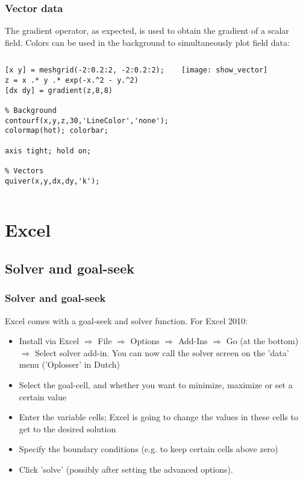 \documentclass[11pt,table,final,fleqn,xcolor={usenames,dvipsnames},unknownkeysallowed]{beamer}
\begin{document}
\begin{frame}[fragile]
  \frametitle{Vector data}
  The gradient operator, as expected, is used to obtain the gradient of a scalar field. Colors can be used in the background to simultaneously plot field data:
  \begin{columns}[T]
    \begin{lstlisting}
[x y] = meshgrid(-2:0.2:2, -2:0.2:2);
z = x .* y .* exp(-x.^2 - y.^2)
[dx dy] = gradient(z,8,8)

% Background
contourf(x,y,z,30,'LineColor','none');
colormap(hot); colorbar;

axis tight; hold on;

% Vectors
quiver(x,y,dx,dy,'k');
    \end{lstlisting}
   \begin{center}
      \texttt{[image: show\_vector]}
    \end{center}
  \end{columns}
\end{frame}

\section{Excel}
\subsection*{Solver and goal-seek}
\begin{frame}
  \frametitle{Solver and goal-seek}
  Excel comes with a goal-seek and solver function. For Excel 2010:
  \begin{itemize}
    \item Install via Excel $\Rightarrow$ File $\Rightarrow$ Options $\Rightarrow$ Add-Ins $\Rightarrow$ Go (at the bottom) $\Rightarrow$ Select solver add-in. You can now call the solver screen on the 'data' menu ('Oplosser' in Dutch)
    \item Select the goal-cell, and whether you want to minimize, maximize or set a certain value
    \item Enter the variable cells; Excel is going to change the values in these cells to get to the desired solution
    \item Specify the boundary conditions (e.g. to keep certain cells above zero)
    \item Click 'solve' (possibly after setting the advanced options). 
  \end{itemize}
\end{frame}
\end{document}
